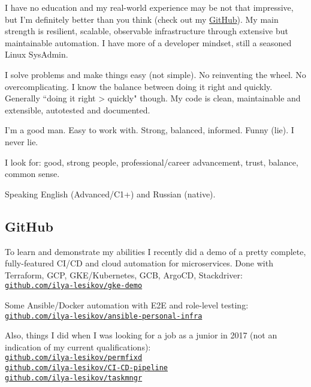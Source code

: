 \documentclass[11pt, a4paper]{article}
\newcommand{\Delimitline}{
  \vspace{-2ex}
  \noindent\makebox[\linewidth]{\rule{\DelimitlineLength}{0.12ex}} }
\newcommand\rurl[1]{%
  \-\hspace{0.5em}
  \href{http://#1}{\nolinkurl{#1}}%
}
\newcommand{\forceindent}{\leavevmode{\parindent=1em\indent}}
\begin{document}
\forceindent I have no education and my real-world experience may be not that impressive, but I'm definitely better than you think (check out my \href{https://github.com/ilya-lesikov/gke-demo}{GitHub}). My main strength is resilient, scalable, observable infrastructure through extensive but maintainable automation. I have more of a developer mindset, still a seasoned Linux SysAdmin.

\forceindent I solve problems and make things easy (not simple). No reinventing the wheel. No overcomplicating. I know the balance between doing it right and quickly. Generally ``doing it right > quickly" though. My code is clean, maintainable and extensible, autotested and documented.

\forceindent I'm a good man. Easy to work with. Strong, balanced, informed. Funny (lie). I never lie.

\forceindent I look for: good, strong people, professional/career advancement, trust, balance, common sense.

\forceindent Speaking English (Advanced/C1+) and Russian (native).


\subsection*{GitHub}
\Delimitline

\forceindent To learn and demonstrate my abilities I recently did a demo of a pretty complete, fully-featured CI/CD and cloud automation for microservices. Done with Terraform, GCP, GKE/Kubernetes, GCB, ArgoCD, Stackdriver:\vspace{0.2em}\\
\rurl{github.com/ilya-lesikov/gke-demo}

Some Ansible/Docker automation with E2E and role-level testing:\vspace{0.2em}\\
\rurl{github.com/ilya-lesikov/ansible-personal-infra}

Also, things I did when I was looking for a job as a junior in 2017 (not an indication of my current qualifications):\vspace{0.2em}\\
\rurl{github.com/ilya-lesikov/permfixd}\\
\rurl{github.com/ilya-lesikov/CI-CD-pipeline}\\
\rurl{github.com/ilya-lesikov/taskmngr}
\end{document}
